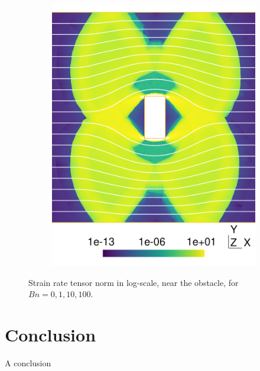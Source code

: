 \documentclass[11 pt]{report}
\begin{document}
\begin{figure}
\begin{subfigure}[t]{0.495\textwidth}
        \includegraphics[width=\textwidth]{../figures/cylinder_100.pdf}
        \label{fig:cylinder100}
    \end{subfigure}
    \caption{Strain rate tensor norm in log-scale, near the obstacle, for $Bn=0,1,10,100$.}
    \label{fig:cylinder}
\end{figure}


\chapter*{Conclusion}
A conclusion
\end{document}
